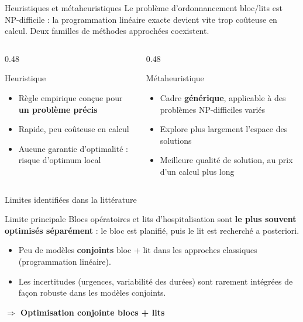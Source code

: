 \documentclass[aspectratio=169,11pt]{beamer}
\begin{document}
\begin{frame}{Heuristiques et métaheuristiques}
  \small
  Le problème d'ordonnancement bloc/lits est \alert{NP-difficile} : la
  programmation linéaire exacte devient vite trop coûteuse en calcul. Deux
  familles de méthodes approchées coexistent.
  \vspace{0.2em}
  \begin{columns}[T]
    \begin{column}{0.48\textwidth}
      \begin{block}{Heuristique}
        \small
        \begin{itemize}
          \item Règle empirique conçue pour \textbf{un problème précis}
          \item Rapide, peu coûteuse en calcul
          \item Aucune garantie d'optimalité : risque d'optimum local
        \end{itemize}
      \end{block}
    \end{column}
    \begin{column}{0.48\textwidth}
      \begin{block}{Métaheuristique}
        \small
        \begin{itemize}
          \item Cadre \textbf{générique}, applicable à des problèmes
          NP-difficiles variés
          \item Explore plus largement l'espace des solutions
          \item Meilleure qualité de solution, au prix d'un calcul plus long
        \end{itemize}
      \end{block}
    \end{column}
  \end{columns}
\end{frame}

\begin{frame}{Limites identifiées dans la littérature}
  \begin{alertblock}{Limite principale}
    Blocs opératoires et lits d'hospitalisation sont \textbf{le plus souvent
    optimisés séparément} : le bloc est planifié, puis le lit est recherché
    a posteriori.
  \end{alertblock}
  \begin{itemize}
    \item Peu de modèles \textbf{conjoints} bloc + lit dans les approches
    classiques (programmation linéaire).
    \item Les incertitudes (urgences, variabilité des durées) sont rarement
    intégrées de façon robuste dans les modèles conjoints.
  \end{itemize}
  \begin{center}
    \large \textcolor{mcmPrimary}{\textbf{$\Rightarrow$ Optimisation conjointe blocs + lits}}
  \end{center}
\end{frame}
\end{document}
